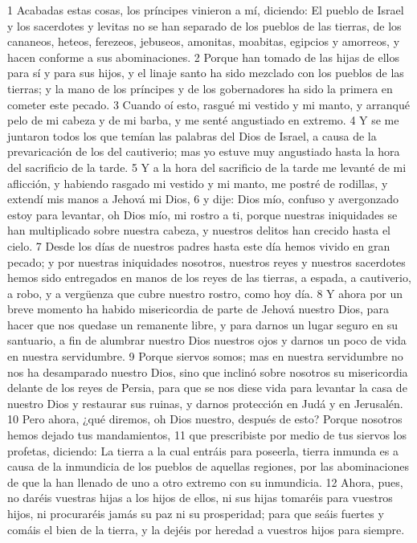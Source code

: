 1 Acabadas estas cosas, los príncipes vinieron a mí, diciendo: El pueblo de Israel y los sacerdotes y levitas no se han separado de los pueblos de las tierras, de los cananeos, heteos, ferezeos, jebuseos, amonitas, moabitas, egipcios y amorreos, y hacen conforme a sus abominaciones.
2 Porque han tomado de las hijas de ellos para sí y para sus hijos, y el linaje santo ha sido mezclado con los pueblos de las tierras; y la mano de los príncipes y de los gobernadores ha sido la primera en cometer este pecado.
3 Cuando oí esto, rasgué mi vestido y mi manto, y arranqué pelo de mi cabeza y de mi barba, y me senté angustiado en extremo.
4 Y se me juntaron todos los que temían las palabras del Dios de Israel, a causa de la prevaricación de los del cautiverio; mas yo estuve muy angustiado hasta la hora del sacrificio de la tarde.
5 Y a la hora del sacrificio de la tarde me levanté de mi aflicción, y habiendo rasgado mi vestido y mi manto, me postré de rodillas, y extendí mis manos a Jehová mi Dios,
6 y dije: Dios mío, confuso y avergonzado estoy para levantar, oh Dios mío, mi rostro a ti, porque nuestras iniquidades se han multiplicado sobre nuestra cabeza, y nuestros delitos han crecido hasta el cielo.
7 Desde los días de nuestros padres hasta este día hemos vivido en gran pecado; y por nuestras iniquidades nosotros, nuestros reyes y nuestros sacerdotes hemos sido entregados en manos de los reyes de las tierras, a espada, a cautiverio, a robo, y a vergüenza que cubre nuestro rostro, como hoy día.
8 Y ahora por un breve momento ha habido misericordia de parte de Jehová nuestro Dios, para hacer que nos quedase un remanente libre, y para darnos un lugar seguro en su santuario, a fin de alumbrar nuestro Dios nuestros ojos y darnos un poco de vida en nuestra servidumbre.
9 Porque siervos somos; mas en nuestra servidumbre no nos ha desamparado nuestro Dios, sino que inclinó sobre nosotros su misericordia delante de los reyes de Persia, para que se nos diese vida para levantar la casa de nuestro Dios y restaurar sus ruinas, y darnos protección en Judá y en Jerusalén.
10 Pero ahora, ¿qué diremos, oh Dios nuestro, después de esto? Porque nosotros hemos dejado tus mandamientos,
11 que prescribiste por medio de tus siervos los profetas, diciendo: La tierra a la cual entráis para poseerla, tierra inmunda es a causa de la inmundicia de los pueblos de aquellas regiones, por las abominaciones de que la han llenado de uno a otro extremo con su inmundicia.
12 Ahora, pues, no daréis vuestras hijas a los hijos de ellos, ni sus hijas tomaréis para vuestros hijos, ni procuraréis jamás su paz ni su prosperidad; para que seáis fuertes y comáis el bien de la tierra, y la dejéis por heredad a vuestros hijos para siempre.
